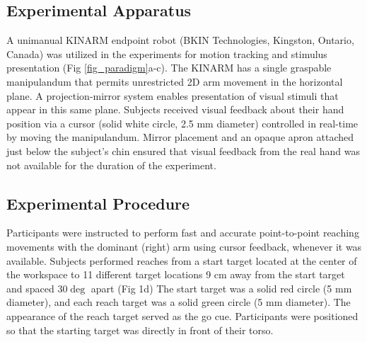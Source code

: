 \documentclass[jou, 11pt, longtable, floatsintext, notab]{apa6}
\begin{document}
\subsection{Experimental Apparatus}
A unimanual KINARM endpoint robot (BKIN Technologies,
Kingston, Ontario, Canada) was utilized in the experiments
for motion tracking and stimulus presentation (Fig
\ref{fig_paradigm}a-c). The KINARM has a single graspable
manipulandum that permits unrestricted 2D arm movement in
the horizontal plane. A projection-mirror system enables
presentation of visual stimuli that appear in this same
plane. Subjects received visual feedback about their hand
position via a cursor (solid white circle, 2.5 mm diameter)
controlled in real-time by moving the manipulandum. Mirror
placement and an opaque apron attached just below the
subject’s chin ensured that visual feedback from the real
hand was not available for the duration of the experiment.

\subsection{Experimental Procedure}
Participants were instructed to perform fast and accurate
point-to-point reaching movements with the dominant (right)
arm using cursor feedback, whenever it was available.
Subjects performed reaches from a start target located at
the center of the workspace to 11 different target locations
9 cm away from the start target and spaced $30\deg$ apart
(Fig 1d) The start target was a solid red circle (5 mm
diameter), and each reach target was a solid green circle (5
mm diameter). The appearance of the reach target served as
the go cue. Participants were positioned so that the
starting target was directly in front of their torso.
\end{document}
